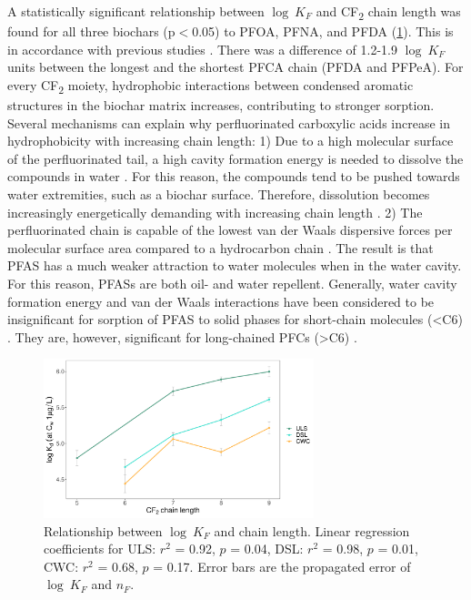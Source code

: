 A statistically significant relationship between $\log~K_F$ and CF\textsubscript{2} chain length was found for all three biochars (p$<$0.05) to PFOA, PFNA, and PFDA (\cref{fig:chainlength}). This is in accordance with previous studies \citep{Sorengard2019, higgins2006sorption, ahmed2020per}. There was a difference of 1.2-1.9 $\log~K_F$ units between the longest and the shortest PFCA chain (PFDA and PFPeA). For every CF\textsubscript{2} moiety, hydrophobic interactions between condensed aromatic structures in the biochar matrix increases, contributing to stronger sorption. Several mechanisms can explain why perfluorinated carboxylic acids increase in hydrophobicity with increasing chain length: 1) Due to a high molecular surface of the perfluorinated tail, a high cavity formation energy is needed to dissolve the compounds in water \citep{Arp2006}. For this reason, the compounds tend to be pushed towards water extremities, such as a biochar surface. Therefore, dissolution becomes increasingly energetically demanding with increasing chain length \citep{sigmund2022sorption}. 2) The perfluorinated chain is capable of the lowest van der Waals dispersive forces per molecular surface area compared to a hydrocarbon chain \citep{du2014adsorption}. The result is that PFAS has a much weaker attraction to water molecules when in the water cavity. For this reason, PFASs are both oil- and water repellent.  Generally, water cavity formation energy and van der Waals interactions have been considered to be insignificant for sorption of PFAS to solid phases for short-chain molecules (\textless C6) \citep{du2014adsorption}. They are, however, significant for long-chained PFCs (\textgreater C6) \citep{du2014adsorption}.

\begin{figure}[tbh]
    \centering
    \includegraphics[width=0.7\textwidth]{R/figs/chain_length_Kd1ugL_plot.pdf}
    \caption{Relationship between $\log~K_F$ and chain length. Linear regression coefficients for ULS: $r^2$ = 0.92, $p$ = 0.04, DSL: $r^2$ = 0.98, $p$ = 0.01, CWC: $r^2$ = 0.68, $p$ = 0.17. Error bars are the propagated error of $\log~K_F$ and $n_F$.}
    \label{fig:chainlength}
\end{figure}

